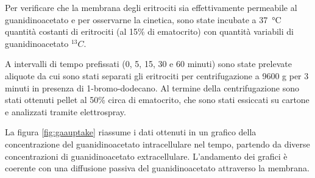 	Per verificare che la membrana degli eritrociti sia effettivamente permeabile al guanidinoacetato e per osservarne la cinetica, sono state incubate a \SI{37}{\celsius} quantit\`a costanti di eritrociti (al 15\% di ematocrito) con quantit\`a variabili di guanidinoacetato $^{13} C$.
	
	A intervalli di tempo prefissati (0, 5, 15, 30 e 60 minuti) sono state prelevate aliquote da cui sono stati separati gli eritrociti per centrifugazione a 9600 g per 3 minuti in presenza di 1-bromo-dodecano.
	Al termine della centrifugazione sono stati ottenuti pellet al 50\% circa di ematocrito, che sono stati essiccati su cartone e analizzati tramite elettrospray.
	
	La figura \ref{fig:gaauptake} riassume i dati ottenuti in un grafico della concentrazione del guanidinoacetato intracellulare nel tempo, partendo da diverse concentrazioni di guanidinoacetato extracellulare.
	L'andamento dei grafici \`e coerente con una diffusione passiva del guanidinoacetato attraverso la membrana.
	
